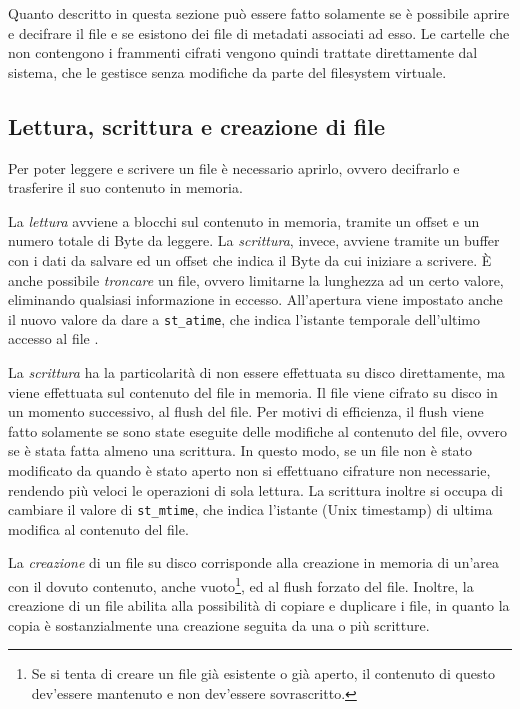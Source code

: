 \documentclass[a4paper,12pt,twoside,openright]{report}
\begin{document}
  Quanto descritto in questa sezione può essere fatto solamente se è possibile aprire e decifrare il file
  e se esistono dei file di metadati associati ad esso.
  Le cartelle che non contengono i frammenti cifrati vengono quindi trattate direttamente dal sistema,
  che le gestisce senza modifiche da parte del filesystem virtuale.

  \subsection{Lettura, scrittura e creazione di file}

  Per poter leggere e scrivere un file è necessario aprirlo, ovvero decifrarlo e trasferire il suo contenuto in memoria.

  La \textit{lettura} avviene a blocchi sul contenuto in memoria, tramite un offset e un numero totale di Byte da leggere.
  La \textit{scrittura}, invece, avviene tramite un buffer con i dati da salvare ed un offset che indica il Byte da cui
  iniziare a scrivere. È anche possibile \textit{troncare} un file, ovvero limitarne la lunghezza ad un certo valore, eliminando
  qualsiasi informazione in eccesso. All'apertura viene impostato anche il nuovo valore da dare a \texttt{st\_atime},
  che indica l'istante temporale dell'ultimo accesso al file \cite{linuxmanstat}.

  La \textit{scrittura} ha la particolarità di non essere effettuata su disco direttamente, ma viene effettuata
  sul contenuto del file in memoria. Il file viene cifrato su disco in un momento successivo, al
  flush del file. Per motivi di efficienza, il flush viene fatto solamente se sono state eseguite
  delle modifiche al contenuto del file, ovvero se è stata fatta almeno una scrittura.
  In questo modo, se un file non è stato modificato da quando è stato aperto non si effettuano cifrature non
  necessarie, rendendo più veloci le operazioni di sola lettura.
  La scrittura inoltre si occupa di cambiare il valore di \texttt{st\_mtime}, che indica
  l'istante (Unix timestamp) di ultima modifica \cite{linuxmanstat} al contenuto del file.

  La \textit{creazione} di un file su disco corrisponde alla creazione in memoria di un'area con il dovuto contenuto,
  anche vuoto\footnote{Se si tenta di creare un file già esistente o già aperto, il contenuto di questo dev'essere mantenuto
  e non dev'essere sovrascritto.}, ed al flush forzato del file. Inoltre, la creazione di un file abilita alla possibilità
  di copiare e duplicare i file, in quanto la copia è sostanzialmente una creazione seguita da una o più scritture.
\end{document}
